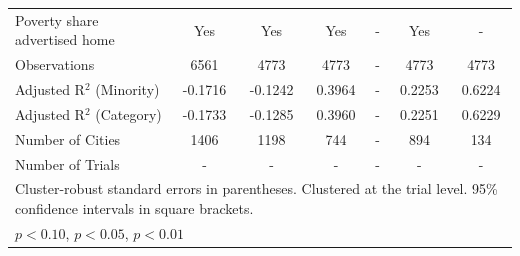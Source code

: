 \begin{table}[htbp]
{\begin{tabular}{l*{6}{c}}
Poverty share advertised home & Yes & Yes & Yes & - & Yes & - \\
Observations & 6561 & 4773 & 4773 & - & 4773 & 4773 \\
Adjusted R$^2$ (Minority) & -0.1716 & -0.1242 & 0.3964 & - & 0.2253 & 0.6224 \\
Adjusted R$^2$ (Category) & -0.1733 & -0.1285 & 0.3960 & - & 0.2251 & 0.6229 \\
Number of Cities & 1406 & 1198 & 744 & - & 894 & 134 \\
Number of Trials & - & - & - & - & - & - \\
\bottomrule
\multicolumn{7}{l}{\footnotesize Cluster-robust standard errors in parentheses. Clustered at the trial level. 95\% confidence intervals in square brackets.}\\
\multicolumn{7}{l}{\footnotesize \sym{*} \(p<0.10\), \sym{**} \(p<0.05\), \sym{***} \(p<0.01\)}\\
\end{tabular}
}
\end{table}
